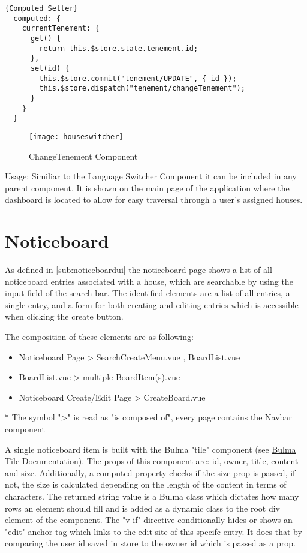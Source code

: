 \begin{lstlisting}[caption=Computed Setter, captionpos=b, style=htmlcssjs, label=computedsetter]{Computed Setter}
  computed: {
    currentTenement: {
      get() {
        return this.$store.state.tenement.id;
      },
      set(id) {
        this.$store.commit("tenement/UPDATE", { id });
        this.$store.dispatch("tenement/changeTenement");
      }
    }
  }
\end{lstlisting}

\begin{figure}[H]
  \begin{center}
  \texttt{[image: houseswitcher]}
  \end{center}
  \caption{ChangeTenement Component}
  \label{fig:langswitcher}
\end{figure}

Usage: Similiar to the Language Switcher Component it can be included in any parent component. It is shown on the main page of the application where the dashboard is located to allow for easy traversal through a user's assigned houses.

\section{Noticeboard}
As defined in \autoref{sub:noticeboardui} the noticeboard page shows a list of all noticeboard entries associated with a house, which are searchable by using the input field of the search bar. The identified elements are a list of all entries, a single entry, and a form for both creating and editing entries which is accessible when clicking the create button.

The composition of these elements are as following:

\begin{itemize}
  \item Noticeboard Page > SearchCreateMenu.vue , BoardList.vue
  \item BoardList.vue > multiple BoardItem(s).vue
  \item Noticeboard Create/Edit Page > CreateBoard.vue
\end{itemize}

* The symbol ">" is read as "is composed of", every page contains the Navbar component

A single noticeboard item is built with the Bulma "tile" component (see \href{https://bulma.io/documentation/layout/tiles/}{Bulma Tile Documentation}). The props of this component are: id, owner, title, content and size. Additionally, a computed property checks if the size prop is passed, if not, the size is calculated depending on the length of the content in terms of characters. The returned string value is a Bulma class which dictates how many rows an element should fill and is added as a dynamic class to the root div element of the component. The "v-if" directive conditionally hides or shows an "edit" anchor tag which links to the edit site of this specifc entry. It does that by comparing the user id saved in store to the owner id which is passed as a prop.

